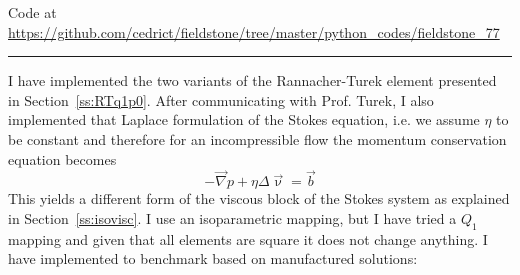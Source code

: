 

\begin{center}
Code at \url{https://github.com/cedrict/fieldstone/tree/master/python_codes/fieldstone_77}
\end{center}

\par\noindent\rule{\textwidth}{0.4pt}


I have implemented the two variants of the Rannacher-Turek element presented
in Section~\ref{ss:RTq1p0}.
After communicating with Prof. Turek, I also implemented that Laplace 
formulation of the Stokes equation, i.e. we assume $\eta$ to be constant 
and therefore for an incompressible flow the momentum conservation 
equation becomes 
\[
-\vec\nabla p + \eta \Delta \vec\upnu = \vec{b}
\]
This yields a different form of the viscous block of the Stokes system
as explained in Section~\ref{ss:isovisc}.
I use an isoparametric mapping, but I have tried a $Q_1$ mapping and given that 
all elements are square it does not change anything. 
I have implemented to benchmark based on manufactured solutions:
